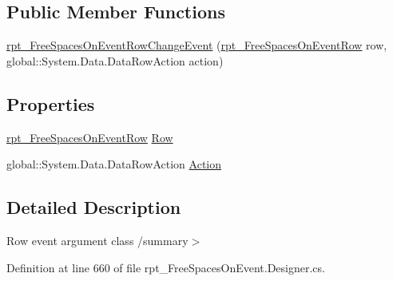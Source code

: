 \subsection*{Public Member Functions}
\begin{DoxyCompactItemize}
\item 
\hyperlink{classprj_progra_i_i_i_1_1rpt___free_spaces_on_event_1_1rpt___free_spaces_on_event_row_change_event_a59d1a974b304ac3a1f707a2dd9acc5cd}{rpt\+\_\+\+Free\+Spaces\+On\+Event\+Row\+Change\+Event} (\hyperlink{classprj_progra_i_i_i_1_1rpt___free_spaces_on_event_1_1rpt___free_spaces_on_event_row}{rpt\+\_\+\+Free\+Spaces\+On\+Event\+Row} row, global\+::\+System.\+Data.\+Data\+Row\+Action action)
\end{DoxyCompactItemize}
\subsection*{Properties}
\begin{DoxyCompactItemize}
\item 
\hyperlink{classprj_progra_i_i_i_1_1rpt___free_spaces_on_event_1_1rpt___free_spaces_on_event_row}{rpt\+\_\+\+Free\+Spaces\+On\+Event\+Row} \hyperlink{classprj_progra_i_i_i_1_1rpt___free_spaces_on_event_1_1rpt___free_spaces_on_event_row_change_event_a87484af61de160691763d5e1d9d4b267}{Row}
\item 
global\+::\+System.\+Data.\+Data\+Row\+Action \hyperlink{classprj_progra_i_i_i_1_1rpt___free_spaces_on_event_1_1rpt___free_spaces_on_event_row_change_event_ad489114e128aaf60f55984cb44893433}{Action}
\end{DoxyCompactItemize}


\subsection{Detailed Description}
Row event argument class /summary$>$ 

Definition at line 660 of file rpt\+\_\+\+Free\+Spaces\+On\+Event.\+Designer.\+cs.



